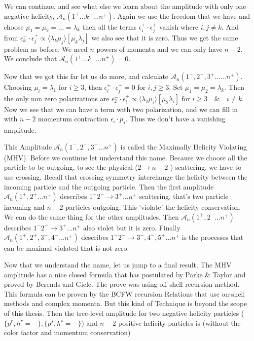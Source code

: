  We can continue, and see what else we learn about the amplitude with only one negative helicity, $\mathcal{A}_{n}(1^{+} \dots k^{-}\dots n^{+})$. Again we use the freedom that we have and choose $\mu_{1} =\mu_{2}= \dots = \lambda_{k}$ then all the terms $\epsilon_{i}^{+} \cdot \epsilon_{j}^{+}$ vanish where $i,j \neq k$. And from $\epsilon_{k}^{-} \cdot \epsilon_{j}^{+}   \propto \langle \lambda_{k} \mu_{j} \rangle [\mu_{k}\lambda_{j}] $ we also see that it is zero. Thus we get the same problem as before. We need $n$ powers of momenta and we can only have $n-2$. We conclude that $\mathcal{A}_{n}(1^{+} \dots k^{-}\dots n^{+}) = 0$.
 
 Now that we got this far let us do more, and calculate $\mathcal{A}_{n}(1^{-},2^{-},3^{+} \dots \dots n^{+})$. Choosing $\mu_{i} = \lambda_{1}$ for $i \geq 3$, then $\epsilon_{i}^{+} \cdot \epsilon_{j}^{+} =0$ for $i,j\geq3$. Set $\mu_{1} = \mu_{2} =\lambda_{k}$. Then the only  non zero polarizations are    $\epsilon_{2}^{-} \cdot \epsilon_{i}^{+} \propto \langle \lambda_{2}\mu_{i} \rangle[\mu_{2}\lambda_{i}] $ for $i \geq 3 \quad \& \quad i\neq k $. Now we see that we can have a term with two polarization, and we can fill in with  $n-2$ momentum contraction $\epsilon_{i} \cdot p_{j}$. Thus we don't have a vanishing amplitude.
 
 This Amplitude $\mathcal{A}_{n}(1^{-},2^{-},3^{+} \dots  n^{+})$ is called the Maximally Helicity Violating (MHV). Before we continue let understand this name. Because we choose all the particle to be outgoing, to see the physical ($2 \rightarrow n-2$ ) scattering, we have to use crossing. Recall that crossing symmetry interchange the helicity between the incoming particle and the outgoing particle. Then the first amplitude $\mathcal{A}_{n}(1^{+},2^{+} \dots n^{+})$ describes $1^{-}2^{-} \rightarrow 3^{+} \dots n^{+}$ scattering, that's two particle incoming and $n-2$ particles outgoing. This 'violate' the helicity conservation.  We can do the same thing for the other amplitudes. Then $\mathcal{A}_{n}(1^{+},2^{-} \dots n^{+})$ describes $1^{-}2^{+} \rightarrow 3^{+} \dots n^{+}$  also violet but it is zero. Finally $\mathcal{A}_{n}(1^{+},2^{+},3^{-},4^{-} \dots n^{+})$ describes $1^{-}2^{-} \rightarrow 3^{-},4^{-},5^{+} \dots n^{+}$ is the processes that can be maximal violated that is not zero.
 
 Now that we understand the name, let us jump to a final result. The MHV amplitude has a nice closed formula that has postulated by Parke $\&$ Taylor and proved by Berends and Giele. The prove was using off-shell recursion method. This formula can be proven by the BCFW recursion Relations that use on-shell methods and complex momenta. But this kind of Technique is beyond the scope of this thesis. Then the tree-level amplitude for two negative helicity particles ($\{p^{r},h^{r} = -\},\{p^{s},h^{s} = -\} $) and $n-2$ positive helicity particles is (without the color factor and momentum conservation) 
 
